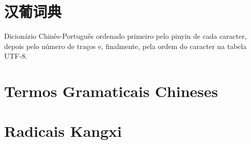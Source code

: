 \documentclass[a4paper,9pt,twoside,openany]{memoir}
\begin{document}



\clearpage
\pagestyle{empty}
\tableofcontents

\clearpage
\pagestyle{empty}
\chapter{汉葡词典}

%
%

Dicionário Chinês-Português ordenado primeiro pelo pinyin de cada
caracter, depois pelo número de traços e, finalmente, pela ordem do
caracter na tabela UTF-8.

\clearpage
\pagestyle{dicionario}
\begin{multicols}{2}























\end{multicols}

\clearpage
\pagestyle{plain}
\chapter{Termos Gramaticais Chineses}


\clearpage
\pagestyle{plain}
\chapter{Radicais Kangxi}


\printindex[pstroke]
\printindex[pradical]
\end{document}
